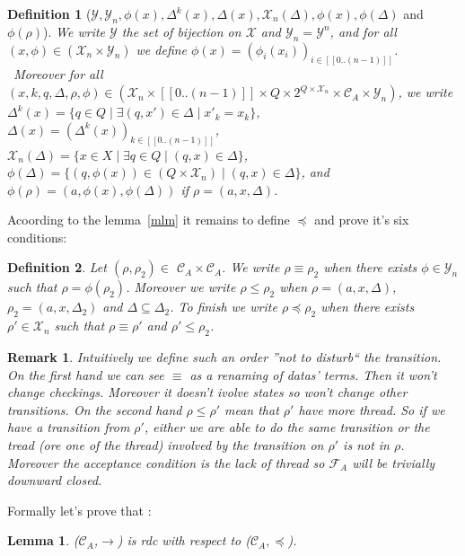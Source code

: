 \documentclass[a4paper,10pt]{report}
\newtheorem{lm}{Lemma}[thr]
\newtheorem{df}{Definition}
\newtheorem{rk}{Remark}
\newcommand{\seg}[1]{[\![#1]\!]}
\newcommand{\ts}{\seg{0 .. (n-1)}}
\newcommand{\C}{\mathcal{C}_{A}}
\newcommand{\F}{\mathcal{F}_{A}}
\newcommand{\Xa}{\mathcal{X}}
\newcommand{\X}{\mathcal{X}_{n}}
\newcommand{\Ya}{\mathcal{Y}}
\newcommand{\Y}{\mathcal{Y}_{n}}
\begin{document}
\begin{df}[$\Ya, \Y, \phi(x),\Delta^k(x),\Delta(x), \X(\Delta),\phi(x), \phi(\Delta)$ and $ \phi(\rho)$]
We write $\Ya$ the set of bijection on $\Xa$ and $\Y = \Ya^n$, and
for all $(x,\phi) \in (\X \times \Y)$ we define $\phi(x) = (\phi_i(x_i))_{i \in \ts} $. \\\  
Moreover for all $(x,k,q,\Delta,\rho,\phi) \in (\X \times \ts \times Q \times 2^{Q \times \X} \times \C \times \Y)$, we write 
$\Delta^k(x) = \{q \in Q \mid \exists  (q,x') \in \Delta \mid x'_k = x_k\}$,
$\Delta(x) = {(\Delta^k(x))}_{k \in \ts}$,
$\X(\Delta) = \{ x\in X \mid \exists q\in Q \mid (q,x) \in \Delta \}$,
$\phi(\Delta) = \{ (q,\phi(x)) \in (Q \times \X) \mid (q,x) \in \Delta \}$,
and $\phi(\rho) = (a,\phi(x),\phi(\Delta))$ if $\rho = (a,x,\Delta)$.
\end{df}

Acoording to the lemma~\ref{mlm} it remains to define $\preceq$ and prove it's six conditions: 

\begin{df}
  Let $(\rho,\rho_2) \in$  $\C\times\C$.
  We write $\rho \equiv \rho_2$ when there exists $\phi \in \Y$ such that  $ \rho = \phi(\rho_2)$.    
  Moreover we write $\rho \leq \rho_2$ when $ \rho=(a ,x, \Delta  )$, $\rho_2=(a ,x, \Delta_2  )$ and $\Delta \subseteq \Delta_2$.
  To finish we write $\rho \preceq \rho_2$ when there exists $\rho' \in \X$ such that $\rho \equiv \rho'$ and $\rho' \leq \rho_2$.
\end{df}



\begin{rk}
  Intuitively we define such an order ''not to disturb`` the transition.
  On the first hand we can see $\equiv$ as a renaming of datas' terms. Then it won't change checkings. Moreover it doesn't ivolve states so won't change other transitions. 
  On the second hand $\rho \leq \rho'$ mean that $\rho'$ have more thread. So if we have a transition from $\rho'$, either we are able to do the same transition 
  or the tread (ore one of the thread) involved by the transition on $\rho'$ is not in $\rho$. 
  Moreover the acceptance condition is the lack of thread so $\F$ will be trivially downward closed. 
\end{rk}

Formally let's prove that :

\begin{lm} \label{cd4}
  ($\C$,$\rightarrow$) is rdc with respect to ($\C,\preceq$).
\end{lm}
\end{document}
